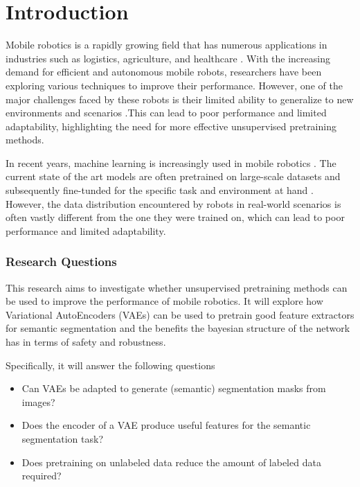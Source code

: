 \chapter{Introduction}\label{chapter:introduction}

Mobile robotics is a rapidly growing field that has numerous applications in industries such as logistics, agriculture, and healthcare \cite{cognominal2021evolving,kebede2024review,clark2023amazon}. With the increasing demand for efficient and autonomous mobile robots, researchers have been exploring various techniques to improve their performance. However, one of the major challenges faced by these robots is their limited ability to generalize to new environments and scenarios \cite{alatise2020review}.This can lead to poor performance and limited adaptability, highlighting the need for more effective unsupervised pretraining methods.

In recent years, machine learning is increasingly used in mobile robotics \cite{almeida2018localization,yu2018ds}. The current state of the art models are often pretrained on large-scale datasets and subsequently fine-tunded for the specific task and environment at hand \cite{Goodfellow-et-al-2016}. However, the data distribution encountered by robots in real-world scenarios is often vastly different from the one they were trained on, which can lead to poor performance and limited adaptability.

\subsection*{Research Questions}
This research aims to investigate whether unsupervised pretraining methods can be used to improve the performance of mobile robotics. It will explore how Variational AutoEncoders (VAEs) \cite{kingma2014autoencodingvariationalbayes} can be used to pretrain good feature extractors for semantic segmentation and the benefits the bayesian structure of the network has in terms of safety and robustness.

Specifically, it will answer the following questions
\begin{itemize}
    \item Can VAEs be adapted to generate (semantic) segmentation masks from images?
    \item Does the encoder of a VAE produce useful features for the semantic segmentation task?
    \item Does pretraining on unlabeled data reduce the amount of labeled data required?
\end{itemize}


